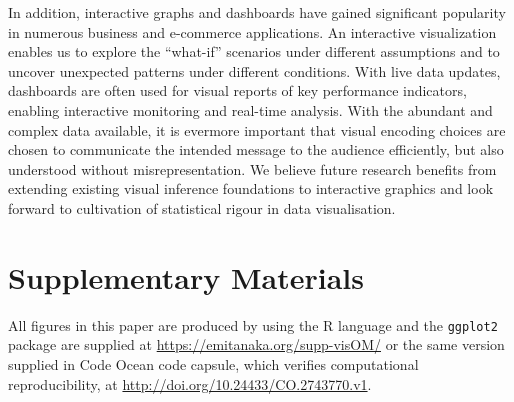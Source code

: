 \documentclass[ijds,nonblindrev]{informs-ijds}
\begin{document}
In addition, interactive graphs and dashboards have gained significant popularity in numerous business and e-commerce applications. An interactive visualization enables us to explore the “what-if” scenarios under different assumptions and to uncover unexpected patterns under different conditions. With live data updates, dashboards are often used for visual reports of key performance indicators, enabling interactive monitoring and real-time analysis. With the abundant and complex data available, it is evermore important that visual encoding choices are chosen to communicate the intended message to the audience efficiently, but also understood without misrepresentation. We believe future research benefits from extending existing visual inference foundations to interactive graphics \citep{Cook2021Foundation} and look forward to cultivation of statistical rigour in data visualisation.



\section*{Supplementary Materials}\label{sec:supp}

All figures in this paper are produced by using the R language \citep{rstats} and the \texttt{ggplot2} package \citep{ggplot2} are supplied at \url{https://emitanaka.org/supp-visOM/} or the same version supplied in Code Ocean code capsule, which verifies computational reproducibility, at \url{http://doi.org/10.24433/CO.2743770.v1}.




\end{document}
